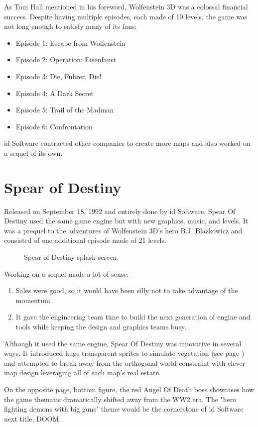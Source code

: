 \documentclass[book.tex]{subfiles}
\begin{document}
As Tom Hall mentioned in his foreword, Wolfenstein 3D was a colossal financial success. Despite having multiple episodes, each made of 10 levels, the game was not long enough to satisfy many of its fans:\\
\begin{itemize}
\item Episode 1: Escape from Wolfenstein
\item Episode 2: Operation: Eisenfaust
\item Episode 3: Die, Fuhrer, Die!
\item Episode 4: A Dark Secret
\item Episode 5: Trail of the Madman
\item Episode 6: Confrontation
\end{itemize}
id Software contracted other companies to create more maps and also worked on a sequel of its own.

\section{Spear of Destiny}
Released on September 18, 1992 and entirely done by id Software, Spear Of Destiny used the same game engine but with new graphics, music, and levels. It was a prequel to the adventures of Wolfenstein 3D's hero B.J. Blazkowicz and consisted of one additional episode made of 21 levels.\\
   \par
\begin{figure}[H]
\centering
 \caption{Spear of Destiny splash screen.}
 \end{figure}
 \par
 Working on a sequel made a lot of sense:
 \begin{enumerate}
 \item Sales were good, so it would have been silly not to take advantage of the momentum.
 \item It gave the engineering team time to build the next generation of engine and tools while keeping the design and graphics teams busy.
 \end{enumerate}
Although it used the same engine, Spear Of Destiny was innovative in several ways. It introduced huge transparent sprites to simulate vegetation (see page \pageref{spears_of_destiny_play}) and attempted to break away from the orthogonal world constraint with clever map design leveraging all of each map's real estate.\\
    \par
On the opposite page, bottom figure, the red Angel Of Death boss showcases how the game thematic dramatically shifted away from the WW2 era. The "hero fighting demons with big guns" theme would be the cornerstone of id Software next title, DOOM. 
\begin{figure}[H]
\centering
 \end{figure}
 \par
 \label{spears_of_destiny_play}
 \begin{figure}[H]
\centering
 \end{figure}
\end{document}
